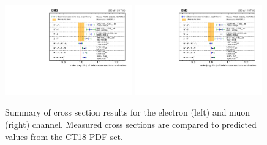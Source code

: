 \begin{figure}[htpb]
\includegraphics[width=0.49\textwidth]{plots/Results/xsecSummary13TeV_ele_ct18.pdf}
\includegraphics[width=0.49\textwidth]{plots/Results/xsecSummary13TeV_muon_ct18.pdf}
\caption{Summary of cross section results for the \sh electron (left) and muon (right) channel. Measured cross sections are compared to predicted values from the CT18 PDF set.}
\label{fig:xs:ct18:13}
\end{figure}